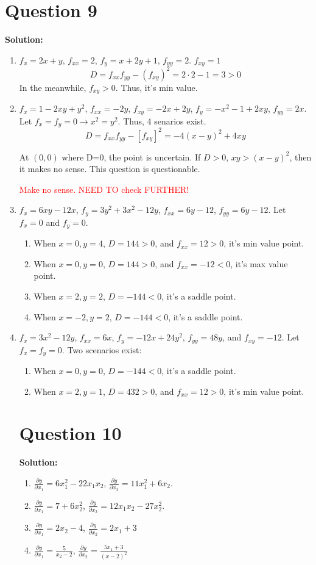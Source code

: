\documentclass[11pt]{article} %
\begin{document}
\section{Question 9}
\textbf{Solution:}
\begin{enumerate}
	\item $f_x=2x+y$, $f_{xx}=2$, $f_y=x+2y+1$, $f_{yy}=2$. $f_{xy}=1$
	$$D=f_{xx}f_{yy}-(f_{xy})^2=2\cdot 2-1=3>0$$
	In the meanwhile, $f_{xy}>0$. Thus, it's min value.
	\item $f_x=1-2xy+y^2$, $f_{xx}=-2y$, $f_{xy}=-2x+2y$, $f_y=-x^2-1+2xy$, $f_{yy}=2x$. Let $f_x=f_y=0 \rightarrow x^2=y^2$. Thus, 4 senarios exist. 
	$$D=f_{xx}f_{yy}-[f_{xy}]^2=-4(x-y)^2+4xy$$
	
	At $(0,0)$ where D=0, the point is uncertain. If $D>0$, $xy>(x-y)^2$, then it makes no sense. This question is questionable. 
	
	\textcolor{red}{Make no sense. NEED TO check FURTHER!}
	\item $f_x=6xy-12x$, $f_y=3y^2+3x^2-12y$, $f_{xx}=6y-12$, $f_{yy}=6y-12$. Let $f_x=0$ and $f_y=0$. 
	\begin{enumerate}
		\item When $x=0, y=4$, $D=144>0$, and $f_{xx}=12>0$, it's min value point.
		\item When $x=0,y=0$, $D=144>0$, and $f_{xx}=-12<0$, it's max value point.
		\item When $x=2,y=2$, $D= -144<0$, it's a saddle point.
		\item When $x=-2,y=2$, $D=-144<0$, it's a saddle point.
	\end{enumerate}
\item $f_x=3x^2-12y$, $f_{xx}=6x$, $f_y=-12x+24y^2$, $f_{yy}=48y$, and $f_{xy}=-12$. Let $f_x=f_y=0$. Two scenarios exist:
\begin{enumerate}
	\item When $x=0, y=0$, $D=-144<0$, it's a saddle point.
	\item When $x=2,y=1$, $D=432>0$, and $f_{xx}=12>0$, it's min value point.
\end{enumerate}

\section{Question 10}
\textbf{Solution:}

\begin{enumerate}
	\item $\frac{\partial y}{\partial x_1}=6x_1^2-22x_1x_2$, $\frac{\partial y}{\partial x_2}=11x_1^2+6x_2$.
	\item $\frac{\partial y}{\partial x_1}=7+6x_2^2$, $\frac{\partial y}{\partial x_2}=12x_1x_2-27x_2^2$.
	\item $\frac{\partial y}{\partial x_1}=2x_2-4$, $\frac{\partial y}{\partial x_2}=2x_1+3$
	\item $\frac{\partial y}{\partial x_1}=\frac{5}{x_2-2}$, $\frac{\partial y}{\partial x_2}=\frac{5x_1+3}{(x-2)^2}$
\end{enumerate}

\end{enumerate}
\end{document}
